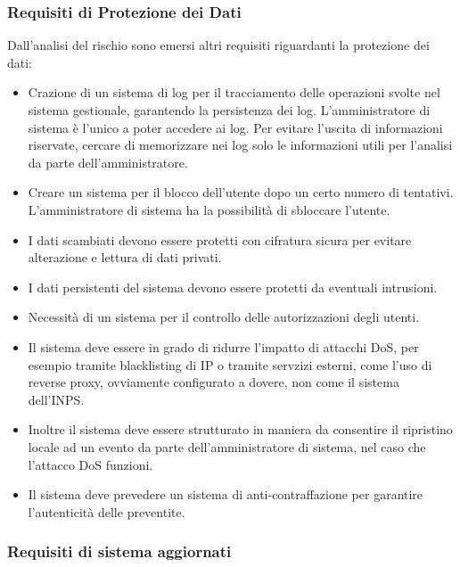 \documentclass[a4paper]{article}
\begin{document}
\subsubsection{Requisiti di Protezione dei Dati}

Dall’analisi del rischio sono emersi altri requisiti riguardanti la protezione dei dati:

\begin{itemize}
    \item Crazione di un sistema di log per il tracciamento delle operazioni svolte nel sistema gestionale, garantendo la persistenza dei log. L'amministratore di sistema è l'unico a poter accedere ai log. Per evitare l'uscita di informazioni riservate, cercare di memorizzare nei log solo le informazioni utili per l'analisi da parte dell'amministratore.
    \item Creare un sistema per il blocco dell'utente dopo un certo numero di tentativi. L'amministratore di sistema ha la possibilità di sbloccare l'utente.
    \item I dati scambiati devono essere protetti con cifratura sicura per evitare alterazione e lettura di dati privati.
    \item I dati persistenti del sistema devono essere protetti da eventuali intrusioni.
    \item Necessità di un sistema per il controllo delle autorizzazioni degli utenti.
    \item Il sistema deve essere in grado di ridurre l'impatto di attacchi DoS, per esempio tramite blacklisting di IP o tramite servzizi esterni, come l'uso di reverse proxy, ovviamente configurato a dovere, non come il sistema dell'INPS.
    \item Inoltre il sistema deve essere strutturato in maniera da consentire il ripristino locale ad un evento da parte dell'amministratore di sistema, nel caso che l'attacco DoS funzioni.
    \item Il sistema deve prevedere un sistema di anti-contraffazione per garantire l'autenticità delle preventite.
\end{itemize}

\subsubsection{Requisiti di sistema aggiornati}
\end{document}
